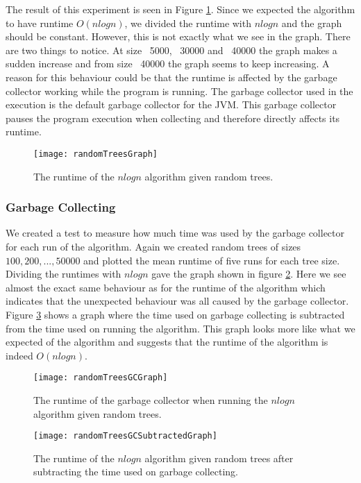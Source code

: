 The result of this experiment is seen in Figure \ref{randomTreesGraph}. Since we expected the algorithm to have runtime $O(nlogn)$, we divided the runtime with $nlogn$ and the graph should be constant. However, this is not exactly what we see in the graph. There are two things to notice. At size ~5000, ~30000 and ~40000 the graph makes a sudden increase and from size ~40000 the graph seems to keep increasing. A reason for this behaviour could be that the runtime is affected by the garbage collector working while the program is running. The garbage collector used in the execution is the default garbage collector for the JVM. This garbage collector pauses the program execution when collecting and therefore directly affects its runtime.

\begin{figure}
	\texttt{[image: randomTreesGraph]}
	\caption{The runtime of the $nlogn$ algorithm given random trees.}
	\label{randomTreesGraph}
\end{figure}

\subsubsection{Garbage Collecting}
We created a test to measure how much time was used by the garbage collector for each run of the algorithm. Again we created random trees of sizes $100, 200, ..., 50000$ and plotted the mean runtime of five runs for each tree size. Dividing the runtimes with $nlogn$ gave the graph shown in figure \ref{randomTreesGCGraph}. Here we see almost the exact same behaviour as for the runtime of the algorithm which indicates that the unexpected behaviour was all caused by the garbage collector. Figure \ref{randomTreesGCSubtractedGraph} shows a graph where the time used on garbage collecting is subtracted from the time used on running the algorithm. This graph looks more like what we expected of the algorithm and suggests that the runtime of the algorithm is indeed $O(nlogn)$.

\begin{figure}
	\texttt{[image: randomTreesGCGraph]}
	\caption{The runtime of the garbage collector when running the $nlogn$ algorithm given random trees.}
	\label{randomTreesGCGraph}
\end{figure}

\begin{figure}
	\texttt{[image: randomTreesGCSubtractedGraph]}
	\caption{The runtime of the $nlogn$ algorithm given random trees after subtracting the time used on garbage collecting.}
	\label{randomTreesGCSubtractedGraph}
\end{figure}

